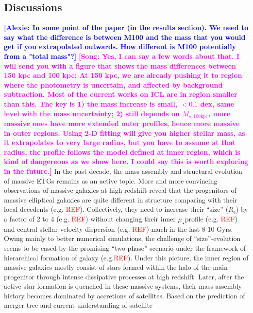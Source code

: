 \documentclass{emulateapj}
\def\mtot{{$M_{\star,100\mathrm{kpc}}$}}
\def\mden{{$\mu_{\star}$}}
\newcommand{\addref}{{\textcolor{red}{REF}}}
\newcommand{\song}[1]{\textcolor{magenta}{\textbf{[Song: #1]}}}
\newcommand{\alexie}[1]{\textcolor{blue}{\textbf{[Alexie: #1]}}}
\begin{document}
\begin{CJK*}{UTF8}{gbsn}
\section{Discussions}
    \label{sec:discussion}
    
    \alexie{In some point of the paper (in the results section). We need to say what the difference is between M100 and the mass that you would get if you extrapolated outwards. How different is M100 potentially from a "total mass"?}
    \song{Yes, I can say a few words about that. I will send you with a figure that shows 
    the mass differences between 150 kpc and 100 kpc; At 150 kpc, we are already pushing 
    it to region where the photometry is uncertain, and affected by background subtraction.
    Most of the current works on ICL are in region smaller than this. 
    The key is 1) the mass increase is small, $<0.1$ dex, same level with the mass 
    uncertainty; 2) still depends on \mtot{}, more massive ones have more 
    extended outer profiles, hence more massive in outer regions.  
    Using 2-D fitting will give you higher stellar mass, as it extrapolates to 
    very large radius, but you have to assume at that radius, the profile follows
    the model defined at inner region, which is kind of dangereous as we show here.
    I could say this is worth exploring in the future.}
    In the past decade, the mass assembly and structural evolution of massive ETGs 
    remains as an active topic.  
    More and more convincing observations of massive galaxies at high redshift reveal that
    the progenitors of massive elliptical galaxies are quite different in structure
    comparing with their local decedents (e.g. \addref{}).  
    Collectively, they need to increase their ``size'' ($R_{\mathrm{e}}$) by a factor of 
    2 to 4 (e.g. \addref{}) without changing their inner \mden profile (e.g. \addref{})
    and central stellar velocity dispersion (e.g. \addref{}) much in the last 8-10 Gyrs.  
    Owing mainly to better numerical simulations, the challenge of ``size''-evolution 
    seems to be eased by the promising ``two-phase'' scenario under the framework of 
    hierarchical formation of galaxy (e.g.\addref{}). 
    Under this picture, the inner region of massive galaxies mostly consist of stars 
    formed within the halo of the main progenitor through intense dissipative processes 
    at high redshift.  
    Later, after the active star formation is quenched in these massive systems, their 
    mass assembly history becomes dominated by accretions of satellites.  
    Based on the prediction of merger tree and current understanding of satellite 

\end{CJK*}
\end{document}
